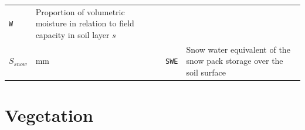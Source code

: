 \documentclass[]{book}
\begin{document}
\begin{longtable}[]{@{}llll@{}}
\begin{minipage}[t]{0.12\columnwidth}
\texttt{W}\strut
\end{minipage} & \begin{minipage}[t]{0.45\columnwidth}\raggedright\strut
Proportion of volumetric moisture in relation to field capacity in soil
layer \(s\)\strut
\end{minipage}\tabularnewline
\begin{minipage}[t]{0.11\columnwidth}\raggedright\strut
\(S_{snow}\)\strut
\end{minipage} & \begin{minipage}[t]{0.10\columnwidth}\raggedright\strut
mm\strut
\end{minipage} & \begin{minipage}[t]{0.12\columnwidth}\raggedright\strut
\texttt{SWE}\strut
\end{minipage} & \begin{minipage}[t]{0.45\columnwidth}\raggedright\strut
Snow water equivalent of the snow pack storage over the soil
surface\strut
\end{minipage}\tabularnewline
\bottomrule
\end{longtable}

\section{Vegetation}\label{vegetation}
\end{document}

